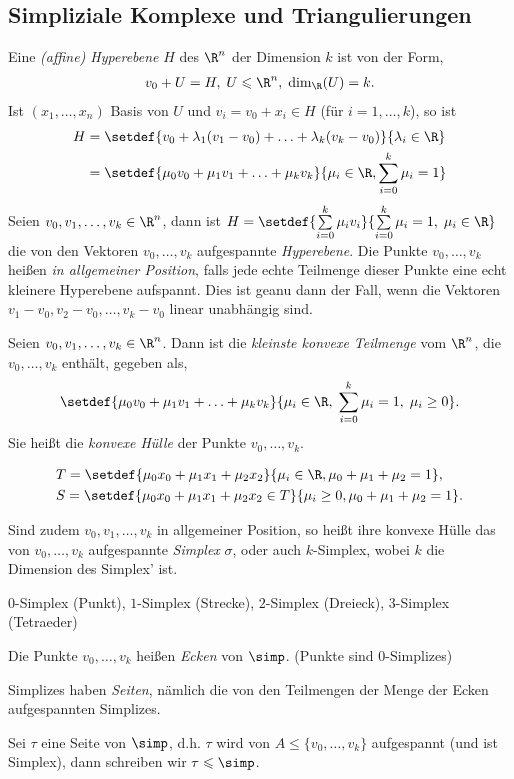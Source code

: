 \subsection{Simpliziale Komplexe und Triangulierungen}

\begin{defn}
\label{defn:4.1.1}
Eine \emph{(affine) Hyperebene} $H$ des $\R^n$ der Dimension $k$ ist von der
Form,
\begin{align*}
v_0 + U = H,\; U\leqslant \R^n,\; \dim_\R (U) = k.
\end{align*}
Ist $(x_1,\ldots,x_n)$ Basis von $U$ und $v_i = v_0+x_i\in H$ (für
$i=1,\ldots,k$), so ist
\begin{align*}
H &= \setdef{v_0+\lambda_1(v_1-v_0)+\ldots+\lambda_k(v_k-v_0)}{\lambda_i\in\R}
\\ &= \setdef{\mu_0v_0+\mu_1v_1+\ldots+\mu_k v_k}{\mu_i\in\R,
\sum\limits_{i=0}^k \mu_i = 1}
\end{align*}
Seien $v_0,v_1,\ldots,v_k\in\R^n$, dann ist
$H=\setdef{\sum\limits_{i=0}^{k}\mu_iv_i}{\sum\limits_{i=0}^k
\mu_i=1,\;\mu_i\in\R}$ die von den Vektoren $v_0,\ldots,v_k$ aufgespannte
\emph{Hyperebene}. Die Punkte $v_0,\ldots,v_k$ heißen \emph{in allgemeiner
Position}, falls jede echte Teilmenge dieser Punkte eine echt kleinere
Hyperebene aufspannt. Dies ist geanu dann der Fall, wenn die Vektoren
$v_1-v_0,v_2-v_0,\ldots,v_k-v_0$ linear unabhängig sind.

Seien $v_0,v_1,\ldots,v_k\in\R^n$. Dann ist die \emph{kleinste konvexe
Teilmenge} vom $\R^n$, die $v_0,\ldots,v_k$ enthält, gegeben als,
\begin{align*}
\setdef{\mu_0v_0+\mu_1v_1+\ldots+\mu_kv_k}{\mu_i\in\R,\;\sum\limits_{i=0}^k
\mu_i = 1,\;\mu_i\ge 0}.
\end{align*}
Sie heißt die \emph{konvexe Hülle} der Punkte $v_0,\ldots,v_k$.
\begin{bspn}
\begin{align*}
&T = \setdef{\mu_0x_0+\mu_1x_1+\mu_2x_2}{\mu_i\in\R, \mu_0+\mu_1+\mu_2 = 1},\\
&S = \setdef{\mu_0x_0+\mu_1x_1+\mu_2x_2 \in T}{\mu_i \ge 0, \mu_0+\mu_1+\mu_2 =
1}.
\end{align*} 
\end{bspn}
Sind zudem $v_0,v_1,\ldots,v_k$ in allgemeiner Position, so heißt ihre konvexe
Hülle das von $v_0,\ldots,v_k$ aufgespannte \emph{Simplex} $\sigma$, oder auch
$k$-Simplex, wobei $k$ die Dimension des Simplex' ist.
\begin{bspn}
$0$-Simplex (Punkt), $1$-Simplex (Strecke), $2$-Simplex (Dreieck), $3$-Simplex
(Tetraeder)
\end{bspn}
Die Punkte $v_0,\ldots,v_k$ heißen \emph{Ecken} von $\simp$. (Punkte sind
$0$-Simplizes)

Simplizes haben \emph{Seiten}, nämlich die von den Teilmengen der Menge der
Ecken aufgespannten Simplizes.

Sei $\tau$ eine Seite von $\simp$, d.h. $\tau$ wird von
$A\leqslant\{v_0,\ldots,v_k\}$ aufgespannt (und ist Simplex), dann schreiben
wir $\tau\leqslant\simp$.\fishhere
\end{defn}

